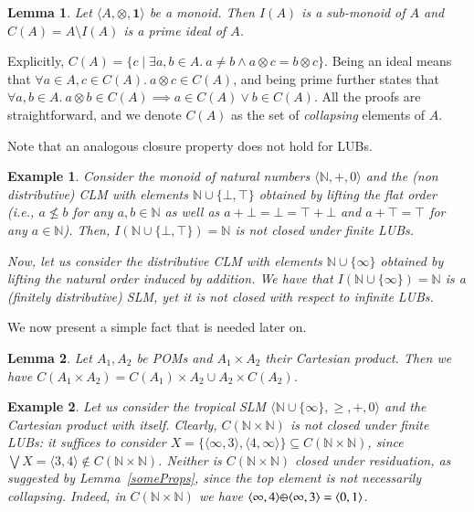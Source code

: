 \documentclass[a4paper]{elsarticle}
\newtheorem{example}{Example}
\newtheorem{lemma}{Lemma}
\newcommand{\monop}{\otimes}
\newcommand{\1}{\mathbf{1}}
\def\odiv{{ \ominus\hspace{-8pt}:}\;}
\begin{document}
\begin{lemma}
	\label{ideal}
	Let $\langle A, \monop, \1 \rangle$ be a monoid.
	Then $I(A)$ is a sub-monoid of $A$ and $C(A) = A\setminus I(A)$ 
	is a prime ideal of $A$.
\end{lemma}

Explicitly, $C(A) = \{ c \mid \exists a, b \in A.\ a \neq b \wedge a \otimes c = b \otimes c\}$.
%
Being an ideal means that $\forall a \in A, c \in C( A).\ a \otimes c \in C(A)$,
and being prime further states that 
$\forall a, b \in A.\ a\otimes b \in C( A) \implies a \in C(A) \vee b \in C(A)$.
%
All the proofs are straightforward, and we denote $C(A)$ as the set of \emph{collapsing} 
elements of $A$. 

Note that an analogous closure property does not hold for LUBs.

\begin{example}\label{flat}
	Consider the monoid of natural numbers $\langle \mathbb N, +, 0 \rangle$ and 
	the (non distributive) CLM with elements $\mathbb N \cup \{\bot,\top\}$ obtained by lifting 
	the flat order (i.e., $a \not \leq b$ for any $a, b \in \mathbb N$ as well as 
	$a + \bot = \bot = \top + \bot$ and $a + \top = \top$  for any $a \in \mathbb N$).
	Then, $I(\mathbb N \cup \{\bot,\top\}) = \mathbb N$ is not closed under finite LUBs. 
	
	Now, let us consider the distributive CLM with elements $\mathbb N \cup \{\infty\}$ 
	obtained by lifting the natural order induced by addition.
	We have that $I(\mathbb N \cup  \{\infty\}) = \mathbb N$ is a (finitely distributive) SLM, yet
	it is not closed with respect to infinite LUBs.
\end{example}

We now present a simple fact that is needed later on.

\begin{lemma}
	Let $A_1, A_2$ be POMs and $A_1 \times A_2$ their Cartesian product.
	Then we have $C(A_1 \times A_2) = C(A_1) \times A_2 \cup A_2 \times C(A_2)$. 
\end{lemma}

\begin{example}
	Let us consider the tropical SLM $\langle \mathbb N \cup \{\infty\}, \geq, +, 0 \rangle$ 
	and the Cartesian product with itself. 
	Clearly, $C(\mathbb N\times \mathbb N)$ is not closed under finite LUBs: it suffices to consider 
	$X= \{\langle \infty, 3 \rangle, \langle 4, \infty \rangle\} \subseteq C(\mathbb N\times \mathbb N)$,
	since $\bigvee X  = \langle 3,4 \rangle \not \in C(\mathbb N\times \mathbb N)$.
	Neither is $C(\mathbb N\times \mathbb N)$ closed under residuation, as suggested by 
	Lemma~\ref{someProps}, since the top element is not necessarily collapsing.
	Indeed, in $C(\mathbb N\times \mathbb N)$ we have 
	$\langle \infty, 4 \rangle  \odiv \langle \infty, 3 \rangle = \langle 0,1\rangle$.
\end{example}
\end{document}
